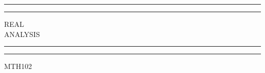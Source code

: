\documentclass{notes}
\begin{document}
	\begin{titlepage} %
		
		\centering %
		
		\scshape %
		
		\vspace*{\baselineskip} %
		
		
		\rule{\textwidth}{1.6pt}\vspace*{-\baselineskip}\vspace*{2pt} %
		\rule{\textwidth}{0.4pt} %
		
		\vspace{0.75\baselineskip} %
		
		{\huge REAL\\ ANALYSIS\\} %
		
		\vspace{0.75\baselineskip} %
		
		\rule{\textwidth}{0.4pt}\vspace*{-\baselineskip}\vspace{3.2pt} %
		\rule{\textwidth}{1.6pt} %
		
		\vspace{2\baselineskip} %
		
		
		\LARGE{MTH102~\nocite{abb01understanding}\nocite{introduction}\nocite{wiki}} 
		
		\vspace*{3\baselineskip} %
		
		
		
		\vspace{0.5\baselineskip} %
		
		

\end{titlepage}
\end{document}
